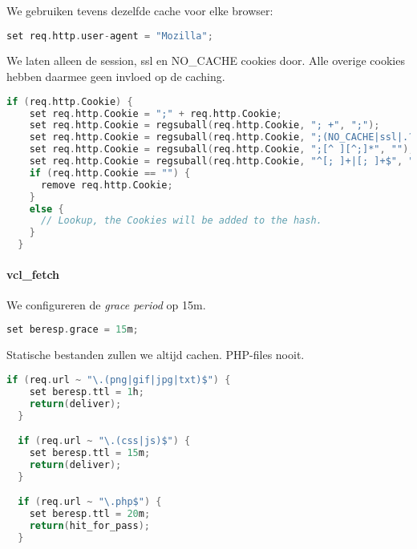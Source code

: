 We gebruiken tevens dezelfde cache voor elke browser:

\begin{lstlisting}[language=C]
  set req.http.user-agent = "Mozilla";
\end{lstlisting}

We laten alleen de session, ssl en NO\_CACHE cookies door. Alle overige cookies hebben daarmee geen invloed op de caching.

\begin{lstlisting}[language=C]
  if (req.http.Cookie) {
    set req.http.Cookie = ";" + req.http.Cookie;
    set req.http.Cookie = regsuball(req.http.Cookie, "; +", ";");
    set req.http.Cookie = regsuball(req.http.Cookie, ";(NO_CACHE|ssl|.?SESS[^=]+)=", "; \1=");
    set req.http.Cookie = regsuball(req.http.Cookie, ";[^ ][^;]*", "");
    set req.http.Cookie = regsuball(req.http.Cookie, "^[; ]+|[; ]+$", "");
    if (req.http.Cookie == "") {
      remove req.http.Cookie;
    }
    else {
      // Lookup, the Cookies will be added to the hash.
    }
  }
\end{lstlisting}

\paragraph{vcl\_fetch}

We configureren de \textit{grace period} op 15m.

\begin{lstlisting}[language=C]
  set beresp.grace = 15m;
\end{lstlisting}

Statische bestanden zullen we altijd cachen. PHP-files nooit.

\begin{lstlisting}[language=C]
  if (req.url ~ "\.(png|gif|jpg|txt)$") {
    set beresp.ttl = 1h;
    return(deliver);
  }

  if (req.url ~ "\.(css|js)$") {
    set beresp.ttl = 15m;
    return(deliver);
  }

  if (req.url ~ "\.php$") {
    set beresp.ttl = 20m;
    return(hit_for_pass);
  }
\end{lstlisting}


